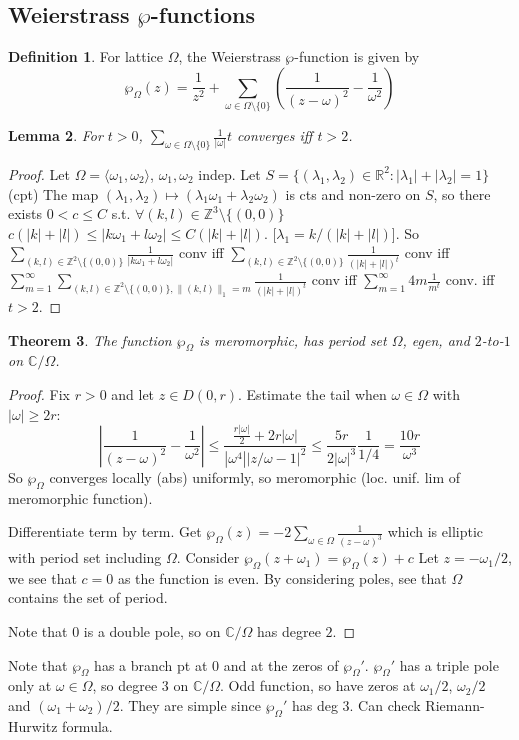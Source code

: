 \documentclass{article}
\theoremstyle{definition}
\newtheorem{defn}{Definition}[section]
\theoremstyle{remark}
\theoremstyle{plain}
\newtheorem{lem}[defn]{Lemma}
\newtheorem{thm}[defn]{Theorem}
\newcommand{\ZZ}{\mathbb{Z}}
\newcommand{\RR}{\mathbb{R}}
\newcommand{\CC}{\mathbb{C}}
\begin{document}
\subsection{Weierstrass $\wp$-functions}
\begin{defn}
    For lattice $\Omega$, the Weierstrass $\wp$-function is given by
    \[\wp_\Omega(z)=\frac{1}{z^2}+\sum_{\omega\in\Omega\setminus\{0\}}\left(\frac{1}{(z-\omega)^2}-\frac{1}{\omega^2}\right)\]
\end{defn}
\begin{lem}
    For $t>0$, $\sum_{\omega\in\Omega\setminus\{0\}}\frac{1}{|\omega|}t$ converges iff $t>2$.
\end{lem}
\begin{proof}
    Let $\Omega=\langle\omega_1,\omega_2\rangle$, $\omega_1,\omega_2$ indep. Let $S=\{(\lambda_1,\lambda_2)\in\RR^2:|\lambda_1|+|\lambda_2|=1\}$ (cpt) The map $(\lambda_1,\lambda_2)\mapsto(\lambda_1\omega_1+\lambda_2\omega_2)$ is cts and non-zero on $S$, so there exists $0<c\le C$ s.t. $\forall (k,l)\in\ZZ^3\setminus\{(0,0)\}$ $c(|k|+|l|)\le |k\omega_1+l\omega_2|\le C(|k|+|l|)$. [$\lambda_1=k/(|k|+|l|)$]. So $\sum_{(k,l)\in\ZZ^2\setminus\{(0,0)\}}\frac{1}{|k\omega_1+l\omega_2|}$ conv iff $\sum_{(k,l)\in\ZZ^2\setminus\{(0,0)\}}\frac{1}{(|k|+|l|)^t}$ conv iff $\sum_{m=1}^\infty\sum_{(k,l)\in\ZZ^2\setminus\{(0,0)\}, \|(k,l)\|_1=m}\frac{1}{(|k|+|l|)^t}$ conv iff $\sum_{m=1}^\infty 4m\frac{1}{m^t}$ conv. iff $t>2$.
\end{proof}
\begin{thm}
    The function $\wp_\Omega$ is meromorphic, has period set $\Omega$, egen, and $2$-to-$1$ on $\CC/\Omega$.
\end{thm}
\begin{proof}
    Fix $r>0$ and let $z\in D(0,r)$. Estimate the tail when $\omega\in\Omega$ with $|\omega|\ge 2r$:
    \[\left|\frac{1}{(z-\omega)^2}-\frac{1}{\omega^2}\right|\le \frac{\frac{r|\omega|}{2}+2r|\omega|}{|\omega^4||z/\omega-1|^2}\le \frac{5r}{2|\omega|^3}\frac{1}{1/4}=\frac{10r}{\omega^3}\]
    So $\wp_\Omega$ converges locally (abs) uniformly, so meromorphic (loc. unif. lim of meromorphic function).

    Differentiate term by term. Get $\wp_{\Omega}(z)=-2\sum_{\omega\in\Omega}\frac{1}{(z-\omega)^3}$ which is elliptic with period set including $\Omega$. Consider $\wp_\Omega(z+\omega_1)=\wp_\Omega(z)+c$ Let $z=-\omega_1/2$, we see that $c=0$ as the function is even. By considering poles, see that $\Omega$ contains the set of period.

    Note that $0$ is a double pole, so on $\CC/\Omega$ has degree $2$.
\end{proof} 
Note that $\wp_\Omega$ has a branch pt at $0$ and at the zeros of $\wp_\Omega'$. $\wp_\Omega'$ has a triple pole only at $\omega\in\Omega$, so degree $3$ on $\CC/\Omega$.
Odd function, so have zeros at $\omega_1/2$, $\omega_2/2$ and $(\omega_1+\omega_2)/2$. They are simple since $\wp_\Omega'$ has deg $3$.
Can check Riemann-Hurwitz formula.
\end{document}
